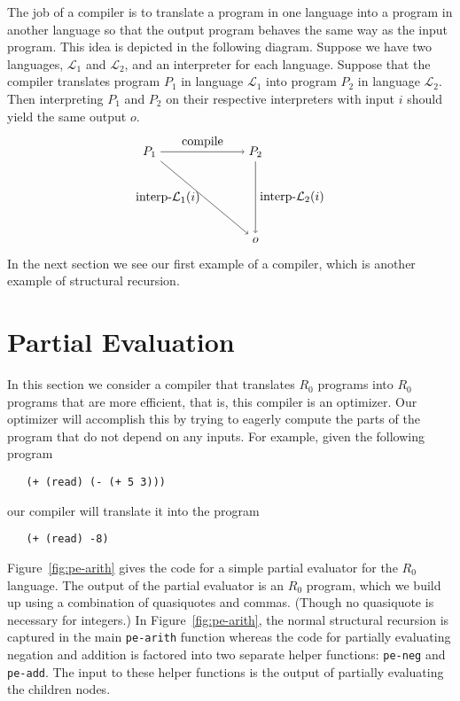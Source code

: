 \documentclass[11pt]{book}
\begin{document}
The job of a compiler is to translate a program in one language into a
program in another language so that the output program behaves the
same way as the input program. This idea is depicted in the following
diagram. Suppose we have two languages, $\mathcal{L}_1$ and
$\mathcal{L}_2$, and an interpreter for each language.  Suppose that
the compiler translates program $P_1$ in language $\mathcal{L}_1$ into
program $P_2$ in language $\mathcal{L}_2$.  Then interpreting $P_1$
and $P_2$ on their respective interpreters with input $i$ should yield
the same output $o$.
\begin{equation} \label{eq:compile-correct}
\begin{tikzpicture}[baseline=(current  bounding  box.center)]
 \node (p1) at (0,  0) {$P_1$};
 \node (p2) at (3,  0) {$P_2$};
 \node (o)  at (3, -2.5) {$o$};

 \path[->] (p1) edge [above] node {compile} (p2);
 \path[->] (p2) edge [right] node {interp-$\mathcal{L}_2$($i$)} (o);
 \path[->] (p1) edge [left]  node {interp-$\mathcal{L}_1$($i$)} (o);
\end{tikzpicture}
\end{equation}
In the next section we see our first example of a compiler, which is
another example of structural recursion.


\section{Partial Evaluation}
\label{sec:partial-evaluation}

In this section we consider a compiler that translates $R_0$
programs into $R_0$ programs that are more efficient, that is,
this compiler is an optimizer. Our optimizer will accomplish this by
trying to eagerly compute the parts of the program that do not depend
on any inputs. For example, given the following program
\begin{lstlisting}
   (+ (read) (- (+ 5 3)))
\end{lstlisting}
our compiler will translate it into the program
\begin{lstlisting}
   (+ (read) -8)
\end{lstlisting}

Figure~\ref{fig:pe-arith} gives the code for a simple partial
evaluator for the $R_0$ language. The output of the partial evaluator
is an $R_0$ program, which we build up using a combination of
quasiquotes and commas. (Though no quasiquote is necessary for
integers.) In Figure~\ref{fig:pe-arith}, the normal structural
recursion is captured in the main \texttt{pe-arith} function whereas
the code for partially evaluating negation and addition is factored
into two separate helper functions: \texttt{pe-neg} and
\texttt{pe-add}. The input to these helper functions is the output of
partially evaluating the children nodes.
\end{document}
